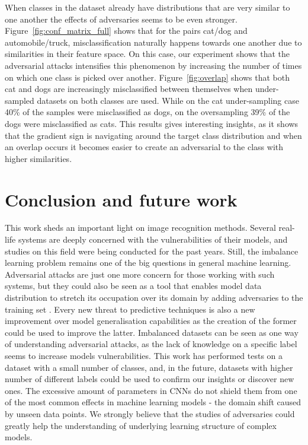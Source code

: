 \documentclass[runningheads,a4paper]{llncs}
\begin{document}
When classes in the dataset already have distributions that are very similar to one another the effects of adversaries seems to be even stronger. Figure~\ref{fig:conf_matrix_full} shows that for the pairs cat/dog and automobile/truck, misclassification naturally happens towards one another due to similarities in their feature space. On this case, our experiment shows that the adversarial attacks intensifies this phenomenon by increasing the number of times on which one class is picked over another. Figure~\ref{fig:overlap} shows that both cat and dogs are increasingly misclassified between themselves when under-sampled datasets on both classes are used. While on the cat under-sampling case 40\% of the samples were misclassified as dogs, on the oversampling 39\% of the dogs were misclassified as cats. This results gives interesting insights, as it shows that the gradient sign is navigating around the target class distribution and when an overlap occurs it becomes easier to create an adversarial to the class with higher similarities.


\section{Conclusion and future work}

This work sheds an important light on image recognition methods. Several real-life systems are deeply concerned with the vulnerabilities of their models, and studies on this field were being conducted for the past years. Still, the imbalance learning problem remains one of the big questions in general machine learning. Adversarial attacks are just one more concern for those working with such systems, but they could also be seen as a tool that enables model data distribution to stretch its occupation over its domain by adding adversaries to the training set \cite{goodfellow2016}. Every new threat to predictive techniques is also a new improvement over model generalisation capabilities as the creation of the former could be used to improve the latter. Imbalanced datasets can be seen as one way of understanding adversarial attacks, as the lack of knowledge on a specific label seems to increase models vulnerabilities. This work has performed tests on a dataset with a small number of classes, and, in the future, datasets with higher number of different labels could be used to confirm our insights or discover new ones. The excessive amount of parameters in CNNs do not shield them from one of the most common effects in machine learning models - the domain shift caused by unseen data points. We strongly believe that the studies of adversaries could greatly help the understanding of underlying learning structure of complex models.


 

\end{document}
